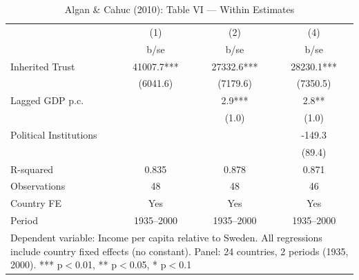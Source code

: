 \begin{table}[htbp]\centering
\def\sym#1{\ifmmode^{#1}\else\(^{#1}\)\fi}
\caption{Algan \& Cahuc (2010): Table VI --- Within Estimates}
\begin{tabular}{l*{3}{c}}
\toprule
            &\multicolumn{1}{c}{(1)}&\multicolumn{1}{c}{(2)}&\multicolumn{1}{c}{(4)}\\
            &        b/se   &        b/se   &        b/se   \\
\midrule
Inherited Trust&     41007.7***&     27332.6***&     28230.1***\\
            &    (6041.6)   &    (7179.6)   &    (7350.5)   \\
Lagged GDP p.c.&               &         2.9***&         2.8** \\
            &               &       (1.0)   &       (1.0)   \\
Political Institutions&               &               &      -149.3   \\
            &               &               &      (89.4)   \\
\midrule
R-squared   &       0.835   &       0.878   &       0.871   \\
Observations&          48   &          48   &          46   \\
Country FE  &         Yes   &         Yes   &         Yes   \\
Period      &  1935--2000   &  1935--2000   &  1935--2000   \\
\bottomrule
\multicolumn{4}{l}{\footnotesize Dependent variable: Income per capita relative to Sweden.  All regressions include country fixed effects (no constant).  Panel: 24 countries, 2 periods (1935, 2000).  *** p$<$0.01, ** p$<$0.05, * p$<$0.1}\\
\end{tabular}
\end{table}

